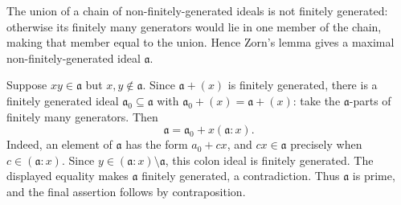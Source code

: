 The union of a chain of non-finitely-generated ideals is not finitely generated: otherwise its finitely many generators would lie in one member of the chain, making that member equal to the union. Hence Zorn's lemma gives a maximal non-finitely-generated ideal $\mathfrak{a}$.

Suppose $xy\in\mathfrak{a}$ but $x,y\notin\mathfrak{a}$. Since $\mathfrak{a}+(x)$ is finitely generated, there is a finitely generated ideal $\mathfrak{a}_0\subseteq\mathfrak{a}$ with $\mathfrak{a}_0+(x)=\mathfrak{a}+(x)$: take the $\mathfrak{a}$-parts of finitely many generators. Then
\[\mathfrak{a}=\mathfrak{a}_0+x(\mathfrak{a}:x).\]
Indeed, an element of $\mathfrak{a}$ has the form $a_0+cx$, and $cx\in\mathfrak{a}$ precisely when $c\in(\mathfrak{a}:x)$. Since $y\in(\mathfrak{a}:x)\setminus\mathfrak{a}$, this colon ideal is finitely generated. The displayed equality makes $\mathfrak{a}$ finitely generated, a contradiction. Thus $\mathfrak{a}$ is prime, and the final assertion follows by contraposition.
